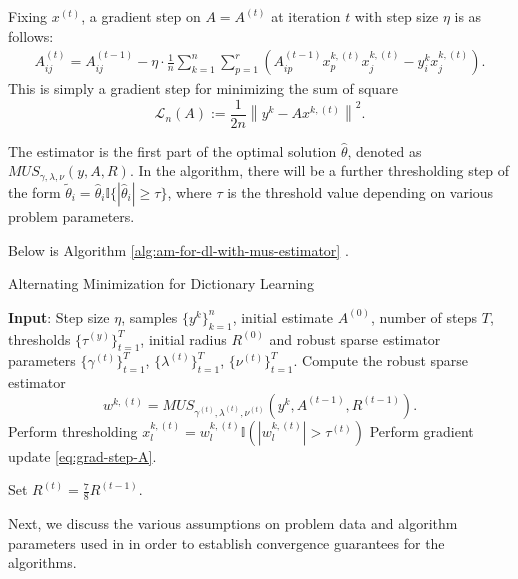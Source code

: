 Fixing $x^{(t)}$, a gradient step on $A = A^{(t)}$ at iteration $t$ with step size $\eta$ is as follows: 
\begin{align}
   A_{ij}^{(t)} = A_{ij}^{(t-1)} - \eta\cdot \frac{1}{n} \sum_{k=1}^n \sum_{p=1}^r \left( A_{ip}^{(t-1)} x_p^{k, (t)} x_j^{k, (t)} - y_i^k x_j^{k, (t)} \right).  \label{eq:grad-step-A}
\end{align}
This is simply a gradient step for minimizing the sum of square
\begin{equation}
    \mathcal{L}_n(A) := \frac{1}{2n} \left\| y^k - A x^{k, (t)} \right\|^2. 
\end{equation}

The estimator is the first part of the optimal solution $\hat{\theta}$, denoted as $MUS_{\gamma,  \lambda, \nu}(y, A, R)$. In the algorithm, there will be a further thresholding step of the form $\tilde{\theta}_i = \hat{\theta}_i \mathbb{I}\{|\hat{\theta}_i| \geq \tau \}$, where $\tau$ is the threshold value depending on various problem parameters.

Below is Algorithm \ref{alg:am-for-dl-with-mus-estimator} \cite{chatterji2017alternating}.

\begin{algorithm}
\caption{Alternating Minimization for Dictionary Learning}
\label{alg:am-for-dl-with-mus-estimator}
\begin{algorithmic}
\STATE \textbf{Input}: Step size $\eta$, samples $\{y^k\}_{k=1}^n$, initial estimate $A^{(0)}$, number of steps $T$, thresholds $\{\tau^{(y)}\}_{t=1}^T$, initial radius $R^{(0)}$ and robust sparse estimator parameters $\{\gamma^{(t)}\}_{t=1}^T$, $\{\lambda^{(t)}\}_{t=1}^T$, $\{\nu^{(t)}\}_{t=1}^T$.
    \STATE Compute the robust sparse estimator \[w^{k, (t)} = MUS_{\gamma^{(t)}, \lambda^{(t)}, \nu^{(t)}}(y^k, A^{(t-1)}, R^{(t-1)}).\] 
        \STATE Perform thresholding $x^{k, (t)}_l = w_l^{k, (t)} \mathbb{I}\left( |w_l^{k, (t)}| > \tau^{(t)} \right)$
    \ENDFOR
\ENDFOR
{}
        \STATE Perform gradient update \eqref{eq:grad-step-A}.
    \ENDFOR
\ENDFOR

\STATE Set $R^{(t)} = \frac{7}{8}R^{(t-1)}$. 
\ENDFOR 
\end{algorithmic}
\end{algorithm}

Next, we discuss the various assumptions on problem data and algorithm parameters used in \cite{chatterji2017alternating} in order to establish convergence guarantees for the algorithms.

